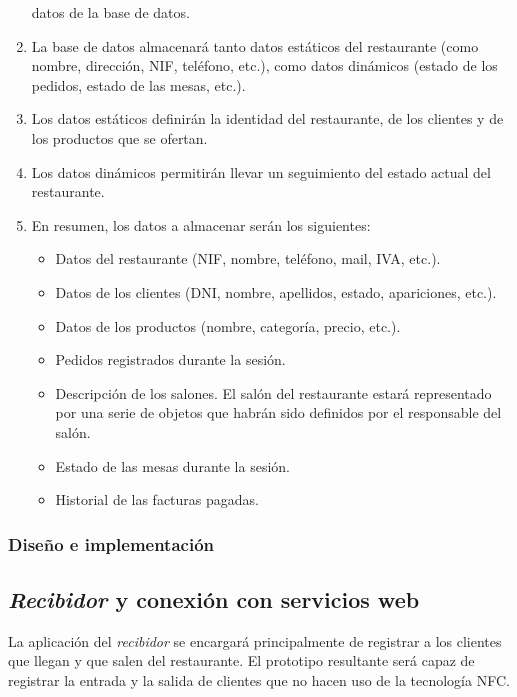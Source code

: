 \begin{enumerate}
datos de la base de datos.
\item La base de datos almacenará tanto datos estáticos del restaurante (como
nombre, dirección, NIF, teléfono, etc.), como datos dinámicos (estado de los 
pedidos, estado de las mesas, etc.).
\item Los datos estáticos definirán la identidad del restaurante, de los
clientes y de los productos que se ofertan.
\item Los datos dinámicos permitirán llevar un seguimiento del estado actual
del restaurante.
\item En resumen, los datos a almacenar serán los siguientes:
  \begin{itemize}
  \item Datos del restaurante (NIF, nombre, teléfono, mail, IVA, etc.).
  \item Datos de los clientes (DNI, nombre, apellidos, estado, apariciones,
  etc.).
  \item Datos de los productos (nombre, categoría, precio, etc.).
  \item Pedidos registrados durante la sesión.
  \item Descripción de los salones. El salón del restaurante estará
  representado por una serie de objetos que habrán sido definidos por el
  responsable del salón.
  \item Estado de las mesas durante la sesión.
  \item Historial de las facturas pagadas.
  \end{itemize}
\end{enumerate}

\subsubsection{Diseño e implementación}


\subsection{\emph{Recibidor} y conexión con servicios web}
La aplicación del \emph{recibidor} se encargará principalmente de registrar a
los clientes que llegan y que salen del restaurante. El prototipo resultante
será capaz de registrar la entrada y la salida de clientes que no hacen uso
de la tecnología \acs{NFC}.

